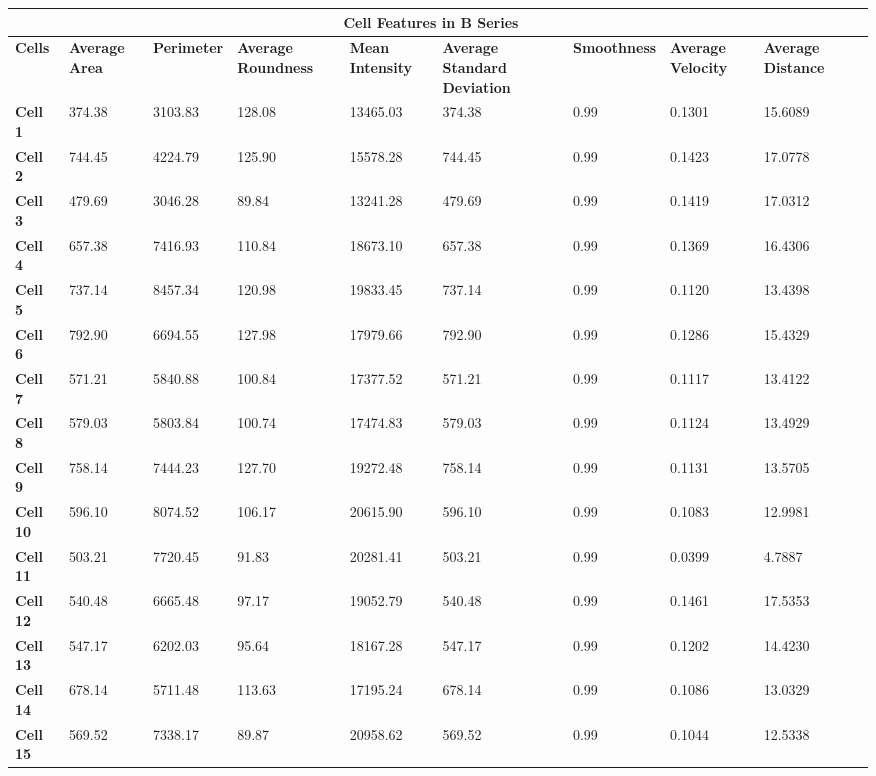 \documentclass{article}
\begin{document}
\begin{table}[h!]
\centering
\begin{tabular}{ |p{1.2cm}|p{1.5cm}|p{1.5cm}|p{1.7cm}|p{1.7cm}|p{1.7cm}|p{1.7cm}|p{1.7cm}|p{1.7cm}|p{1.7cm}| }
\hline
\multicolumn{9}{|c|}{\textbf{Cell Features in B Series}} \\
\hline
\textbf{Cells} & \textbf{Average Area} & \textbf{Perimeter} & \textbf{Average Roundness} & \textbf{Mean Intensity} & \textbf{Average Standard Deviation} & \textbf{Smoothness} & \textbf{Average Velocity} & \textbf{Average Distance} \\
\hline
\textbf{Cell 1} & 374.38 & 3103.83 & 128.08 & 13465.03 & 374.38 & 0.99 & 0.1301 & 15.6089\\
\textbf{Cell 2} & 744.45 & 4224.79 & 125.90 & 15578.28 & 744.45 & 0.99 & 0.1423 & 17.0778 \\
\textbf{Cell 3} & 479.69 & 3046.28 & 89.84 & 13241.28 & 479.69 & 0.99 & 0.1419 & 17.0312 \\
\textbf{Cell 4} & 657.38 & 7416.93 & 110.84 & 18673.10 & 657.38 & 0.99 & 0.1369 & 16.4306 \\
\textbf{Cell 5} & 737.14 & 8457.34 & 120.98 & 19833.45 & 737.14 & 0.99 & 0.1120 & 13.4398\\
\textbf{Cell 6} & 792.90 & 6694.55 & 127.98 & 17979.66 & 792.90 & 0.99 & 0.1286 & 15.4329\\
\textbf{Cell 7} & 571.21 & 5840.88 & 100.84 & 17377.52 & 571.21 & 0.99 & 0.1117 & 13.4122\\
\textbf{Cell 8} & 579.03 & 5803.84 & 100.74 & 17474.83 & 579.03 & 0.99 & 0.1124 & 13.4929\\
\textbf{Cell 9} & 758.14 & 7444.23 & 127.70 & 19272.48 & 758.14 & 0.99 & 0.1131 & 13.5705\\
\textbf{Cell 10} & 596.10 & 8074.52 & 106.17 & 20615.90 & 596.10 & 0.99 & 0.1083 & 12.9981\\
\textbf{Cell 11} & 503.21 & 7720.45 & 91.83 & 20281.41 & 503.21 & 0.99 & 0.0399 & 4.7887\\
\textbf{Cell 12} & 540.48 & 6665.48 & 97.17 & 19052.79 & 540.48 & 0.99 & 0.1461 & 17.5353\\
\textbf{Cell 13} & 547.17 & 6202.03 & 95.64 & 18167.28 & 547.17 & 0.99 & 0.1202 & 14.4230\\
\textbf{Cell 14} & 678.14 & 5711.48 & 113.63 & 17195.24 & 678.14 & 0.99 & 0.1086 &  13.0329\\
\textbf{Cell 15} & 569.52 & 7338.17 & 89.87 & 20958.62 & 569.52 & 0.99 & 0.1044 & 12.5338\\
\hline
\end{tabular}
\end{table}
\end{document}
